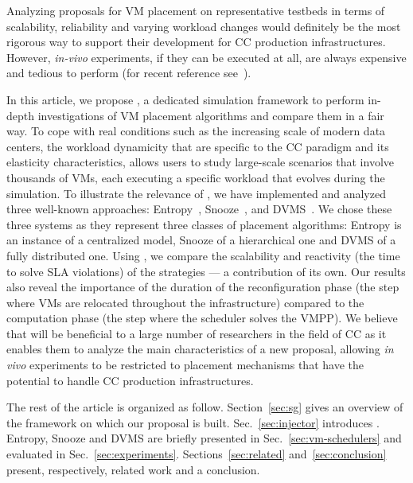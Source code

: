 Analyzing proposals for VM placement on representative testbeds in
terms of scalability, reliability and varying workload changes would
definitely be the most rigorous way to support their development for
CC production infrastructures.
However, \textit{in-vivo} experiments, if they can be
executed at all, are always expensive and tedious to perform (for
recent reference see~\cite{barker:pitfalls}).

In this article, we propose \vmps, a dedicated simulation framework to
perform in-depth investigations of VM placement algorithms and compare
them in a fair way. To cope with real conditions such as the
increasing scale of modern data centers, the workload dynamicity
that are specific to the CC paradigm and its elasticity
characteristics, \vmps allows users to study large-scale scenarios
that involve thousands of VMs,
each executing a specific workload that evolves during the
simulation.
%
%
To illustrate the relevance of \vmps, we have implemented and analyzed
three well-known approaches:
Entropy~\cite{Hermenier:2009:ECM:1508293.1508300},
Snooze~\cite{feller:ccgrid12}, and DVMS~\cite{quesnel:cpe2012}.
We chose these three systems as they represent three classes of
placement algorithms: Entropy is an instance of a centralized model,
Snooze of a hierarchical one and DVMS of a fully distributed one.
Using \vmps, we compare the scalability and reactivity (\ie the time
to solve SLA violations) of the strategies --- a contribution of its
own.  Our results also reveal the importance of the duration of the
reconfiguration phase (\ie the step where VMs are relocated throughout
the infrastructure) compared to the computation phase (\ie the step
where the scheduler solves the VMPP).
%
%
We believe that \vmps will be beneficial to a large number of
researchers in the field of CC as it enables them to analyze the main
characteristics of a new proposal, allowing \textit{in vivo}
experiments to be restricted to placement mechanisms that have the
potential to handle CC production infrastructures.

The rest of the article is
organized as follow.
Section~\ref{sec:sg} gives an overview of the \sg
framework on which our proposal is built. Sec.~\ref{sec:injector}
introduces \vmps.
Entropy, Snooze and DVMS are briefly presented in
Sec.~\ref{sec:vm-schedulers} and evaluated in
Sec.~\ref{sec:experiments}. Sections~\ref{sec:related}
and~\ref{sec:conclusion} present, respectively, related work and a
conclusion.



%
